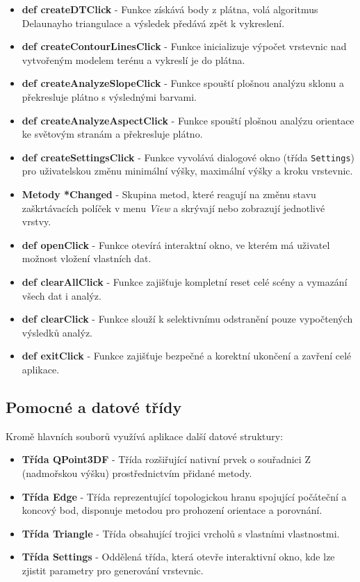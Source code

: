 \documentclass[9pt, a4paper]{article}
\begin{document}
\begin{itemize}
\item \textbf{def createDTClick} - Funkce získává body z plátna, volá algoritmus Delaunayho triangulace a výsledek předává zpět k vykreslení.
\item \textbf{def createContourLinesClick} - Funkce inicializuje výpočet vrstevnic nad vytvořeným modelem terénu a vykreslí je do plátna.
\item \textbf{def createAnalyzeSlopeClick} - Funkce spouští plošnou analýzu sklonu a překresluje plátno s výslednými barvami.
\item \textbf{def createAnalyzeAspectClick} - Funkce spouští plošnou analýzu orientace ke světovým stranám a překresluje plátno.
\item \textbf{def createSettingsClick} - Funkce vyvolává dialogové okno (třída \texttt{Settings}) pro uživatelskou změnu minimální výšky, maximální výšky a kroku vrstevnic.
\item \textbf{Metody *Changed} - Skupina metod, které reagují na změnu stavu zaškrtávacích políček v menu \textit{View} a skrývají nebo zobrazují jednotlivé vrstvy.
\item \textbf{def openClick} - Funkce otevírá interaktní okno, ve kterém má uživatel možnost vložení vlastních dat.
\item \textbf{def clearAllClick} - Funkce zajišťuje kompletní reset celé scény a vymazání všech dat i analýz.
\item \textbf{def clearClick} - Funkce slouží k selektivnímu odstranění pouze vypočtených výsledků analýz.
\item \textbf{def exitClick} - Funkce zajišťuje bezpečné a korektní ukončení a zavření celé aplikace.
\end{itemize}

\newpage
\subsection*{Pomocné a datové třídy}
\vspace{0.3 cm}
Kromě hlavních souborů využívá aplikace další datové struktury:
\vspace{0.3 cm}

\begin{itemize}
\item \textbf{Třída QPoint3DF} - Třída rozšiřující nativní prvek o souřadnici Z (nadmořskou výšku) prostřednictvím přidané metody.
\item \textbf{Třída Edge} - Třída reprezentující topologickou hranu spojující počáteční a koncový bod, disponuje metodou pro prohození orientace a porovnání.
\item \textbf{Třída Triangle} - Třída obsahující trojici vrcholů s vlastními vlastnostmi.
\item \textbf{Třída Settings} - Oddělená třída, která otevře interaktivní okno, kde lze zjistit parametry pro generování vrstevnic.
\end{itemize}
\end{document}
